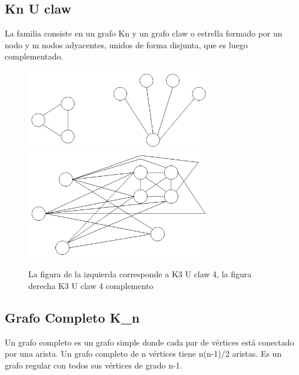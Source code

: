 \subsection{Kn U claw}
La familia consiste en un grafo Kn y un grafo claw o estrella formado por un nodo y m nodos adyacentes, 
unidos de forma disjunta, que es luego complementado.
\begin{figure}[H]
\includegraphics[width=80mm]{K3UC4.png}
\includegraphics[width=80mm]{K3UC4Complemento.png}
\caption{La figura de la izquierda corresponde a K3 U claw 4, la figura derecha K3 U claw 4 complemento}
\label{overflow}
\end{figure}

\subsection{Grafo Completo K_n}
Un grafo completo es un grafo simple donde cada par de vértices está conectado por una arista.
Un grafo completo de n vértices tiene n(n-1)/2 aristas.
Es un grafo regular con todos sus vértices de grado n-1.

